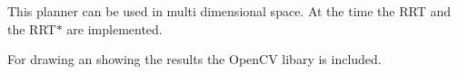 This planner can be used in multi dimensional space. At the time the R\-R\-T and the R\-R\-T$\ast$ are implemented.

For drawing an showing the results the Open\-C\-V libary is included. 